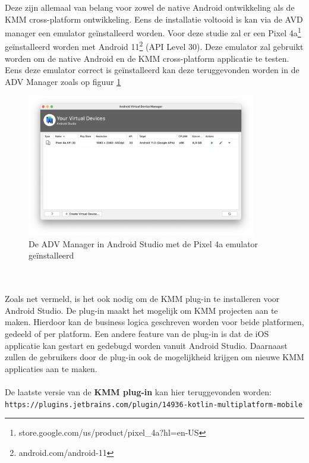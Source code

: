     Deze zijn allemaal van belang voor zowel de native Android ontwikkeling als de KMM cross-platform ontwikkeling. Eens de installatie voltooid is kan via de AVD manager een emulator geïnstalleerd worden. Voor deze studie zal er een Pixel 4a\footnote{store.google.com/us/product/pixel\_4a?hl=en-US} geïnstalleerd worden met Android 11\footnote{android.com/android-11} (API Level 30). Deze emulator zal gebruikt worden om de native Android en de KMM cross-platform applicatie te testen. Eens deze emulator correct is geïnstalleerd kan deze teruggevonden worden in de ADV Manager zoals op figuur \ref{fig:M-as-adv-manager}
    \begin{figure}
        \centering
        \includegraphics[width=10cm]{img/as-adv-manager.png}
        \caption{De ADV Manager in Android Studio met de Pixel 4a emulator geïnstalleerd}
        \label{fig:M-as-adv-manager}
    \end{figure}
    \\ \\
    Zoals net vermeld, is het ook nodig om de KMM plug-in te installeren voor Android Studio. De plug-in maakt het mogelijk om KMM projecten aan te maken. Hierdoor kan de business logica geschreven worden voor beide platformen, gedeeld of per platform. Een andere feature van de plug-in is dat de iOS applicatie kan gestart en gedebugd worden vanuit Android Studio. Daarnaast zullen de gebruikers door de plug-in ook de mogelijkheid krijgen om nieuwe KMM applicaties aan te maken.
    \\ \\ 
    De laatste versie van de \textbf{KMM plug-in} kan hier teruggevonden worden:\\
    \verb*|https://plugins.jetbrains.com/plugin/14936-kotlin-multiplatform-mobile|
    
